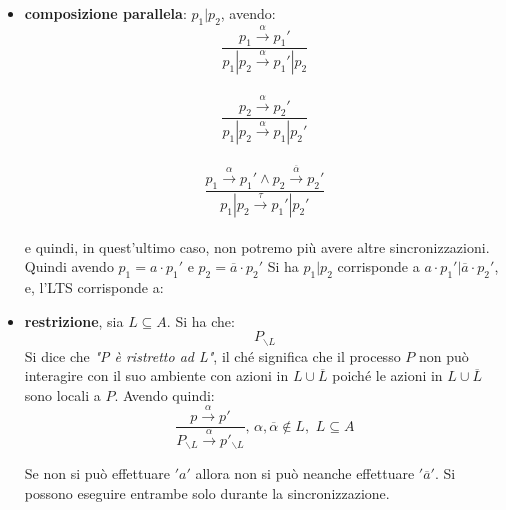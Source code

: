 \begin{itemize}
  \item \textbf{composizione parallela}: $p_1|p_2$, avendo:
  \[\frac{p_1\stackrel{\alpha}{\rightarrow}p_1'}{p_1|p_2
      \stackrel{\alpha}{\rightarrow}p_1'|p_2}\]\\
  \[\frac{p_2\stackrel{\alpha}{\rightarrow}p_2'}{p_1|p_2
      \stackrel{\alpha}{\rightarrow}p_1|p_2'}\]\\
  \[\frac{p_1\stackrel{\alpha}{\rightarrow}p_1'\land p_2
      \stackrel{\overline{\alpha}}{\rightarrow}p_2'}{p_1|p_2
      \stackrel{\tau}{\rightarrow}p_1'|p_2'}\]\\
  e quindi, in quest'ultimo caso, non potremo più avere altre
  sincronizzazioni. \\
  Quindi avendo $p_1=a\cdot p_1'$ e $p_2=\overline{a}\cdot p_2'$ Si ha $p_1|p_2$
  corrisponde a $a\cdot p_1'|\overline{a}\cdot p_2'$, e, l'LTS corrisponde a:
  \begin{center}
  \end{center}
  \item \textbf{restrizione}, sia $L\subseteq A$. Si ha che:
  \[P_{\backslash L}\]
  Si dice che \textit{"P è ristretto ad L"}, il ché significa che il processo $P$ non può interagire con il suo ambiente con
  azioni in $L\cup \overline{L}$ poiché le azioni in $L\cup \overline{L}$ sono
  locali a $P$. Avendo quindi:
  \[\frac{p\stackrel{\alpha}{\rightarrow}p'}{P_{\backslash L}
      \stackrel{\alpha}{\rightarrow}p'_{\backslash L}}
    ,\,\alpha,\overline{\alpha}\not\in L,\,\, L\subseteq A\]
        \begin{nota}
         Se non si può effettuare $'a'$ allora non si può neanche effettuare $'\overline{a}'$. Si possono eseguire entrambe solo durante la sincronizzazione.


\end{nota}
\end{itemize}
